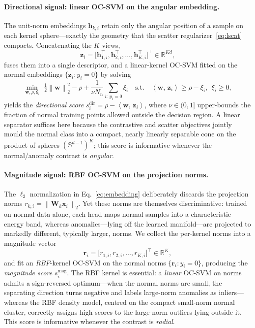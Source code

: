 \documentclass[times, review, 10pt]{elsarticle}
\newcommand{\R}{\mathbb{R}}
\newcommand{\Sph}{\mathbb{S}}
\newcommand{\norm}[1]{\left\lVert #1 \right\rVert}
\newcommand{\inner}[2]{\left\langle #1,\, #2 \right\rangle}
\newcommand{\hh}{\bm{h}}
\newcommand{\zz}{\bm{z}}
\newcommand{\xx}{\bm{x}}
\newcommand{\ww}{\bm{w}}
\newcommand{\WW}{\bm{W}}
\begin{document}
\paragraph{Directional signal: linear OC-SVM on the angular embedding.}
The unit-norm embeddings $\hh_{k,i}$ retain only the angular position of a
sample on each kernel sphere---exactly the geometry that the scatter
regularizer~\eqref{eq:lscat} compacts. Concatenating the $K$ views,
\begin{equation}
\zz_i=\big[\hh_{1,i}^{\!\top},\hh_{2,i}^{\!\top},\dots,
\hh_{K,i}^{\!\top}\big]^{\!\top}\in\R^{Kd},
\label{eq:concat}
\end{equation}
fuses them into a single descriptor, and a linear-kernel OC-SVM fitted on the
normal embeddings $\{\zz_i : y_i=0\}$ by solving
\begin{equation}
\min_{\ww,\rho,\bm{\xi}}\ \
\tfrac{1}{2}\norm{\ww}_2^{2}-\rho
+\frac{1}{\nu N_{\mathrm{n}}}\sum_{i:\,y_i=0}\xi_i
\quad\text{s.t.}\quad
\inner{\ww}{\zz_i}\ge\rho-\xi_i,\ \ \xi_i\ge 0,
\label{eq:ocsvm}
\end{equation}
yields the \emph{directional score}
$s^{\mathrm{dir}}_i=\rho-\inner{\ww}{\zz_i}$, where $\nu\in(0,1]$ upper-bounds
the fraction of normal training points allowed outside the decision region. A
linear separator suffices here because the contrastive and scatter objectives
jointly mould the normal class into a compact, nearly linearly separable cone
on the product of spheres $(\Sph^{d-1})^{K}$; this score is informative
whenever the normal/anomaly contrast is \emph{angular}.

\paragraph{Magnitude signal: RBF OC-SVM on the projection norms.}
The $\ell_2$ normalization in Eq.~\eqref{eq:embedding} deliberately discards the
projection norms $r_{k,i}=\norm{\WW_k\xx_i}_2$. Yet these norms are themselves
discriminative: trained on normal data alone, each head maps normal samples into
a characteristic energy band, whereas anomalies---lying off the learned
manifold---are projected to markedly different, typically larger, norms. We
collect the per-kernel norms into a magnitude vector
\begin{equation}
\bm{r}_i=\big[r_{1,i},r_{2,i},\dots,r_{K,i}\big]^{\!\top}\in\R^{K},
\label{eq:rmag}
\end{equation}
and fit an \emph{RBF}-kernel OC-SVM on the normal norms $\{\bm{r}_i : y_i=0\}$,
producing the \emph{magnitude score} $s^{\mathrm{mag}}_i$. The RBF kernel is
essential: a \emph{linear} OC-SVM on norms admits a sign-reversed optimum---when
the normal norms are small, the separating direction turns negative and labels
large-norm anomalies as inliers---whereas the RBF density model, centred on the
compact small-norm normal cluster, correctly assigns high scores to the
large-norm outliers lying outside it. This score is informative whenever the
contrast is \emph{radial}.
\end{document}
